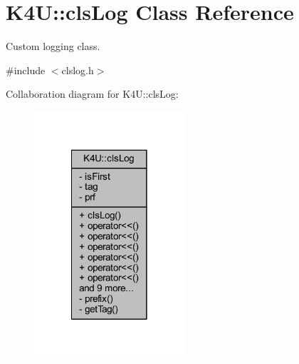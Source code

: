 \hypertarget{class_k4_u_1_1cls_log}{\section{K4\-U\-:\-:cls\-Log Class Reference}
\label{da/d64/class_k4_u_1_1cls_log}
}


Custom logging class.  




{\ttfamily \#include $<$clslog.\-h$>$}



Collaboration diagram for K4\-U\-:\-:cls\-Log\-:\nopagebreak
\begin{figure}[H]
\begin{center}
\leavevmode
\includegraphics[width=158pt]{d4/de8/class_k4_u_1_1cls_log__coll__graph}
\end{center}
\end{figure}
